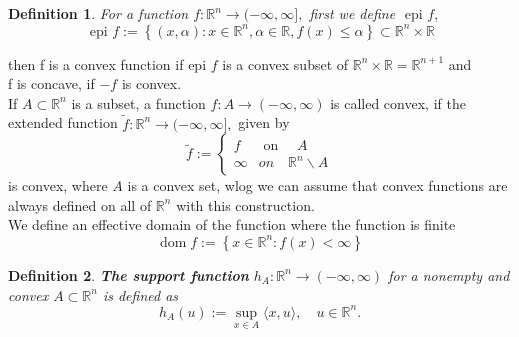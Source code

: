 \documentclass[oneside]{book}
\newtheorem{mydef}{Definition}[section]
\begin{document}
	
	\begin{mydef} \label{d:9}
		For a function   $f: \mathbb{R}^{n} \rightarrow(-\infty, \infty],$ first we define $\text { epi } f, $  
		\begin{equation}
		\label{eq40}
		\text { epi } f:=\left\{(x, \alpha): x \in \mathbb{R}^{n}, \alpha \in \mathbb{R}, f(x) \leq \alpha\right\} \subset \mathbb{R}^{n} \times \mathbb{R} 
		\end{equation}
	\end{mydef}
	
	then f is a convex function if epi $f$ is a convex subset of $\mathbb{R}^{n} \times \mathbb{R}=\mathbb{R}^{n+1}$  and \\  f is concave, if $-f$ is convex. 
	\\
	
	If $A \subset \mathbb{R}^{n}$ is a subset, a function $f: A \rightarrow(-\infty, \infty)$ is called convex, if the extended function $\tilde{f}: \mathbb{R}^{n} \rightarrow(-\infty, \infty],$ given by
	$$
	\tilde{f}:=\left\{\begin{array}{ll}
	f & \text { on } \quad A \\
	\infty & {  on } \quad \mathbb{R}^{n} \backslash A
	\end{array}\right.
	$$
	is convex,  where  $A$ is a convex set, wlog we can assume that convex functions are always defined on all of $\mathbb{R}^{n}$ with this construction.
	\\
	
	We define an effective domain of the function where the function is finite
	$$
	\operatorname{dom} f:=\left\{x \in \mathbb{R}^{n}: f(x)<\infty\right\}
	$$
	
	
	
	\begin{mydef} \label{d:10}
		\textbf{The support function }$h_{A}: \mathbb{R}^{n} \rightarrow(-\infty, \infty) $  for a nonempty and convex $A \subset \mathbb{R}^{n}$ is defined as
		$$
		h_{A}(u):=\sup _{x \in A}\langle x, u\rangle, \quad u \in \mathbb{R}^{n}.
		$$
		
	\end{mydef}
	
	
	
\end{document}
